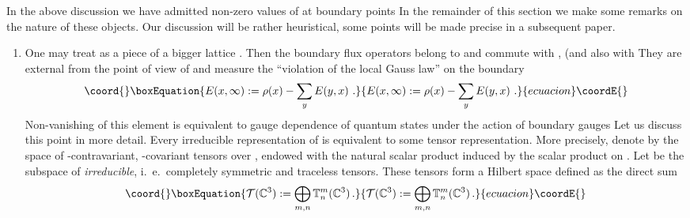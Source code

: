 \documentclass[a4paper,12pt]{article}
\begin{document}
In the above discussion we have admitted non-zero values of \coordHE{} at boundary points \coordHE{} In the
remainder of this section we make some remarks on the nature of
these objects. Our discussion will be rather heuristical, some
points will be made precise in a subsequent paper.
\begin{enumerate}
\item
One may treat \myHighlight{$\Lambda$}\coordHE{} as a piece of a bigger lattice
\myHighlight{$\widetilde{\Lambda}$}\coordHE{}. Then the boundary flux operators \coordHE{} belong to \coordHE{} and commute
with \coordHE{}, (and also with \coordHE{}
They are external from the point of view of \coordHE{}
and measure the  ``violation of the local Gauss law'' on the
boundary \myHighlight{$\partial \Lambda \, :$}\coordHE{}
\begin{equation}\coord{}\boxEquation{\label{ext}
E(x,\infty) := {\rho}(x) - \sum_y E(y,x)  \ .
}{E(x,\infty) := {\rho}(x) - \sum_y E(y,x)  \ .
}{ecuacion}\coordE{}\end{equation}
Non-vanishing of this element is equivalent to gauge dependence of
quantum states under the action of boundary gauges \coordHE{}  \coordHE{} Let us discuss this point in
more detail. Every irreducible representation of \coordHE{} is
equivalent to some tensor representation. More precisely, denote
by \coordHE{} the space of \coordHE{}-contravariant,
\coordHE{}-covariant tensors over \coordHE{}, endowed with the
natural scalar product induced by the scalar product on \coordHE{}. Let \coordHE{} be the subspace of {\em irreducible},
i.~e.~completely symmetric and traceless tensors. These tensors
form a Hilbert space \coordHE{} defined as the
direct sum
\begin{equation}\coord{}\boxEquation{
{\cal T}({\mathbb C}^3) := \bigoplus_{m,n} {{{\mathbb
T}}}^m_n({\mathbb C}^3) \, .
}{
{\cal T}({\mathbb C}^3) := \bigoplus_{m,n} {{{\mathbb
T}}}^m_n({\mathbb C}^3) \, .
}{ecuacion}\coordE{}\end{equation}

\end{enumerate}
\end{document}

